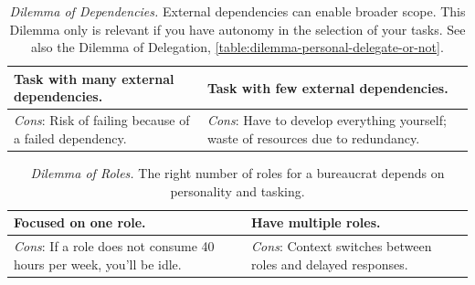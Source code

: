 \begin{center}
\begin{table}[H] %
\begin{tabular}{ | m{\dilemmatablewidth}| m{\dilemmatablewidth} | } 
  \hline
  \textbf{Task with many external dependencies.} & 
  \textbf{Task with few external dependencies.} \\ 
  \hline
  \textit{Cons}: Risk of failing because of a failed dependency. & 
  \textit{Cons}: Have to develop everything yourself; waste of resources due to redundancy. \\  
  \hline
\end{tabular}
\caption{
\textit{Dilemma of Dependencies.}
External dependencies can enable broader scope. This Dilemma only is relevant if you have autonomy in the selection of your tasks. See also the Dilemma of Delegation, \ref{table:dilemma-personal-delegate-or-not}.
}
\label{table:dilemma-personal-number-of-external-dependencies}
\end{table}
\end{center}



\begin{center}
\begin{table}[H] %
\begin{tabular}{ | m{\dilemmatablewidth}| m{\dilemmatablewidth} | } 
  \hline
  \textbf{Focused on one role.} & 
  \textbf{Have multiple roles.} \\ 
  \hline
  \textit{Cons}: If a role does not consume 40 hours per week, you'll be idle. & 
  \textit{Cons}: Context switches between roles and delayed responses. \\  
  \hline
\end{tabular}
\caption{
\textit{Dilemma of Roles.}
The right number of roles for a bureaucrat depends on personality and tasking. 
}
\label{table:dilemma-number-of-roles}
\end{table}
\end{center}

